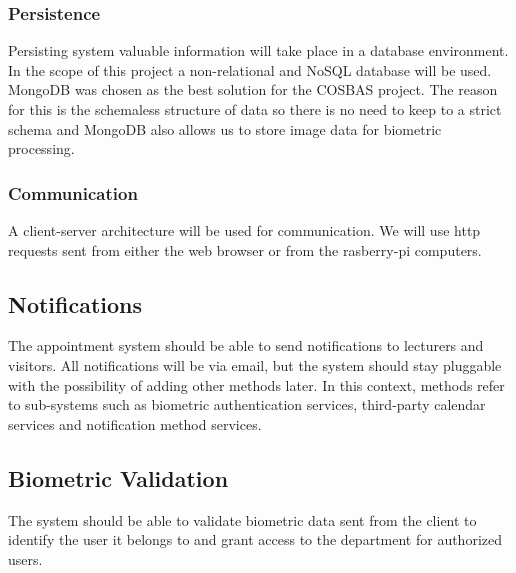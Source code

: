 \subsubsection{Persistence}
Persisting system valuable information will take place in a database environment. In the scope of this project a non-relational and NoSQL database will be used. MongoDB was chosen as the best solution for the COSBAS project. The reason for this is the schemaless structure of data so there is no need to keep to a strict schema and MongoDB also allows us to store image data for biometric processing.

\subsubsection{Communication}
A client-server architecture will be used for communication. We will use http requests sent from either the web browser or from the rasberry-pi computers. 

\subsection{Notifications}
The appointment system should be able to send notifications to lecturers and visitors. All notifications will be via email, but the system should stay pluggable with the possibility of adding other methods later. In this context, methods refer to sub-systems such as biometric authentication services, third-party calendar services and notification method services.

\subsection{Biometric Validation}
The system should be able to validate biometric data sent from the client to identify the user it belongs to and grant access to the department for authorized users.